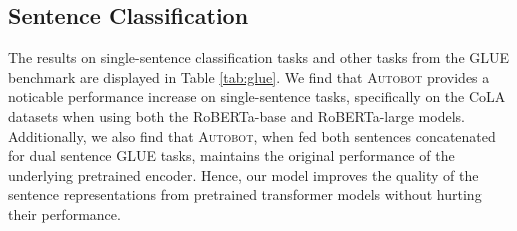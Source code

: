 


\subsection{Sentence Classification} \label{sec:clf}

The results on single-sentence classification tasks and other tasks from the GLUE benchmark are displayed in Table \ref{tab:glue}. We find that \textsc{Autobot} provides a 
noticable performance increase on single-sentence tasks, specifically on the CoLA datasets when using both the RoBERTa-base and RoBERTa-large models.
Additionally, we also find that \textsc{Autobot}, when fed both sentences concatenated for dual sentence GLUE tasks, maintains the original performance of the underlying pretrained encoder.  Hence, our model improves the quality of the sentence representations from pretrained transformer models without hurting their performance.  





